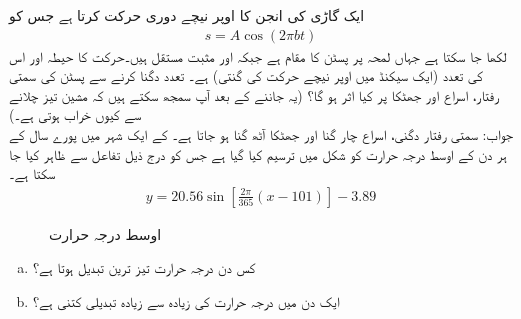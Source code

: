 \quad
ایک گاڑی کی انجن کا  اوپر نیچے  دوری حرکت کرتا ہے جس کو
\begin{align*}
s=A\cos(2\pi bt)
\end{align*}
لکھا جا سکتا ہے جہاں لمحہ  پر  پسٹن کا مقام  ہے جبکہ  اور  مثبت مستقل ہیں۔حرکت کا حیطہ  اور اس کی تعدد (ایک سیکنڈ میں اوپر نیچے حرکت کی گنتی)  ہے۔ تعدد دگنا کرنے سے پسٹن کی سمتی رفتار، اسراع اور جھٹکا پر کیا اثر ہو گا؟ (یہ جاننے کے بعد آپ سمجھ سکتے ہیں کہ مشین تیز چلانے سے کیوں خراب ہوتی ہے۔)\\
 جواب:\quad
سمتی رفتار دگنی، اسراع چار گنا اور جھٹکا آٹھ گنا ہو جاتا ہے۔
\quad
{} کے ایک شہر میں پورے سال کے ہر دن کے اوسط درجہ حرارت کو شکل  میں ترسیم کیا گیا ہے جس کو درج ذیل تفاعل سے ظاہر کیا جا سکتا ہے۔
\begin{align*}
y=20.56\sin[\tfrac{2\pi}{365}(x-101)]-3.89
\end{align*} 
%
\begin{figure}
\centering
{}
\caption{اوسط درجہ حرارت}
\label{شکل_سوال_تفرق_ایلاسکا_الف}
\end{figure}
%
\begin{enumerate}[a.]

\item
کس دن درجہ حرارت تیز ترین تبدیل ہوتا ہے؟
\item
ایک دن میں درجہ حرارت کی زیادہ سے زیادہ تبدیلی کتنی ہے؟ 
\end{enumerate}

